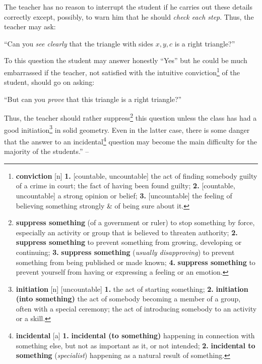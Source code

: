 \documentclass[oneside]{book}
\numberwithin{equation}{section}
\begin{document}
The teacher has no reason to interrupt the student if he carries out these details correctly except, possibly, to warn him that he should \textit{check each step}. Thus, the teacher may ask:

``Can you \textit{see clearly} that the triangle with sides $x,y,c$ is a right triangle?''

To this question the student may answer honestly ``Yes'' but he could be much embarrassed if the teacher, not satisfied with the intuitive conviction\footnote{\textbf{conviction} [n] \textbf{1.} [countable, uncountable] the act of finding somebody guilty of a crime in court; the fact of having been found guilty; \textbf{2.} [countable, uncountable] a strong opinion or belief; \textbf{3.} [uncountable] the feeling of believing something strongly \& of being sure about it.} of the student, should go on asking:

``But can you \textit{prove} that this triangle is a right triangle?''

Thus, the teacher should rather suppress\footnote{\textbf{suppress something} (of a government or ruler) to stop something by force, especially an activity or group that is believed to threaten authority; \textbf{2.} \textbf{suppress something} to prevent something from growing, developing or continuing; \textbf{3.} \textbf{suppress something} (\textit{usually disapproving}) to prevent something from being published or made known; \textbf{4.} \textbf{suppress something} to prevent yourself from having or expressing a feeling or an emotion.} this question unless the class has had a good initiation\footnote{\textbf{initiation} [n] [uncountable] \textbf{1.} the act of starting something; \textbf{2.} \textbf{initiation (into something)} the act of somebody becoming a member of a group, often with a special ceremony; the act of introducing somebody to an activity or a skill.} in solid geometry. Even in the latter case, there is some danger that the answer to an incidental\footnote{\textbf{incidental} [a] \textbf{1.} \textbf{incidental (to something)} happening in connection with something else, but not as important as it, or not intended; \textbf{2.} \textbf{incidental to something} (\textit{specialist}) happening as a natural result of something.} question may become the main difficulty for the majority of the students.'' -- \cite[pp. 13--14]{Polya2014}
\end{document}
